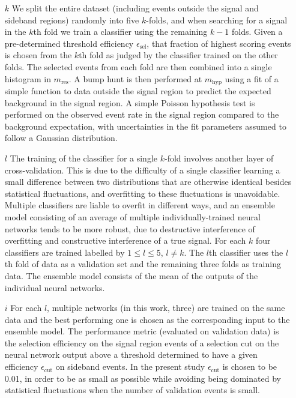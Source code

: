 \documentclass[a4paper,11pt]{article}
\begin{document}
\begin{enumerate}
    \item[$k$] We split the entire dataset (including events outside the signal and sideband regions) randomly into five $k$-folds, and when searching for a signal in the $k$th fold we train a classifier using the remaining $k-1$ folds. Given a pre-determined threshold efficiency $\epsilon_\text{sel}$, that fraction of highest scoring events is chosen from the $k$th fold as judged by the classifier trained on the other folds. The selected events from each fold are then combined into a single histogram in $m_{\text{res}}$. A bump hunt is then performed at $m_{\text{hyp}}$ using a fit of a simple function to data outside the signal region to predict the expected background in the signal region. A simple Poisson hypothesis test is performed on the observed event rate in the signal region compared to the background expectation, with uncertainties in the fit parameters assumed to follow a Gaussian distribution.

    \item[$l$] The training of the classifier for a single $k$-fold involves another layer of cross-validation. This is due to the difficulty of a single classifier learning a small difference between two distributions that are otherwise identical besides statistical fluctuations, and overfitting to these fluctuations is unavoidable. Multiple classifiers are liable to overfit in different ways, and an ensemble model consisting of an average of multiple individually-trained neural networks tends to be more robust, due to destructive interference of overfitting and constructive interference of a true signal. For each $k$ four classifiers are trained labelled by $1 \leq l \leq 5$, $l \neq k$. The $l$th classifier uses the $l$th fold of data as a validation set and the remaining three folds as training data. The ensemble model consists of the mean of the outputs of the individual neural networks.

    \item[$i$]For each $l$, multiple networks (in this work, three) are trained on the same data and the best performing one is chosen as the corresponding input to the ensemble model. The performance metric (evaluated on validation data) is the selection efficiency on the signal region events of a selection cut on the neural network output above a threshold determined to have a given efficiency $\epsilon_\text{cut}$ on sideband events. In the present study $\epsilon_\text{cut}$ is chosen to be 0.01, in order to be as small as possible while avoiding being dominated by statistical fluctuations when the number of validation events is small.


\end{enumerate}
\end{document}
